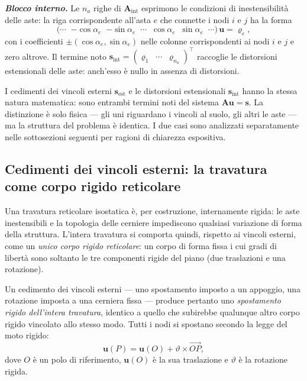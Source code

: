 \vspace{4pt}
\noindent \textit{\textbf{Blocco interno.}}
Le $n_a$ righe di $\bm{A}_\text{int}$ esprimono
le condizioni di inestensibilità delle aste:
la riga corrispondente all'asta $e$ che connette
i nodi $i$ e $j$ ha la forma
\[
\bigl(\cdots\;\;
{-\cos\alpha_e}\;\;{-\sin\alpha_e}
\;\;\cdots\;\;
{\cos\alpha_e}\;\;{\sin\alpha_e}
\;\;\cdots\bigr)\,\bm{u} = \varrho_e,
\]
con i coefficienti $\pm(\cos\alpha_e, \sin\alpha_e)$
nelle colonne corrispondenti ai nodi $i$ e $j$
e zero altrove. Il termine noto $\bm{s}_\text{int}
= (\varrho_1\;\;\cdots\;\;\varrho_{n_a})^\top$
raccoglie le distorsioni estensionali delle aste:
anch'esso è nullo in assenza di distorsioni.

\begin{oss}
	I cedimenti dei vincoli esterni $\bm{s}_\text{est}$
	e le distorsioni estensionali $\bm{s}_\text{int}$
	hanno la stessa natura matematica: sono entrambi
	termini noti del sistema $\bm{A}\bm{u} = \bm{s}$.
	La distinzione è solo fisica --- gli uni riguardano
	i vincoli al suolo, gli altri le aste --- ma la
	struttura del problema è identica. I due casi
	sono analizzati separatamente nelle sottosezioni
	seguenti per ragioni di chiarezza espositiva.
\end{oss}


\subsection{Cedimenti dei vincoli esterni:
	la travatura come corpo rigido reticolare}
\label{subsec:cedimenti_reticolare}

Una travatura reticolare isostatica è, per costruzione,
internamente rigida: le aste inestensibili e la topologia
delle cerniere impediscono qualsiasi variazione di forma
della struttura. L'intera travatura si comporta quindi,
rispetto ai vincoli esterni, come un \emph{unico corpo
	rigido reticolare}: un corpo di forma fissa i cui
gradi di libertà sono soltanto le tre componenti
rigide del piano (due traslazioni e una rotazione).

Un cedimento dei vincoli esterni --- uno spostamento
imposto a un appoggio, una rotazione imposta a una
cerniera fissa --- produce pertanto uno
\emph{spostamento rigido dell'intera travatura},
identico a quello che subirebbe qualunque altro corpo
rigido vincolato allo stesso modo. Tutti i nodi si
spostano secondo la legge del moto rigido:
\begin{equation}\label{eq:moto_rigido_reticolare}
	\mathbf{u}(P) = \mathbf{u}(O) +
	\vartheta \times \overrightarrow{OP},
\end{equation}
dove $O$ è un polo di riferimento, $\mathbf{u}(O)$ è
la sua traslazione e $\vartheta$ è la rotazione rigida.

